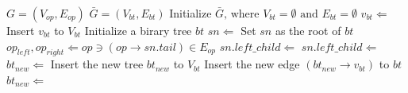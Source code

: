 \documentclass[12pt]{article}
\begin{document}
\begin{CJK}{UTF8}{bkai}
        \begin{algorithm}[h!]    \caption{}
        \begin{algorithmic}[1]
            \Require    $G = ( V_{op} , E_{op} )$ 
            \Ensure     $\bar{G} = ( V_{bt} , E_{bt} )$ 
            \State      Initialize $\bar{G} \textrm{, where } V_{bt} = \emptyset \textrm{ and } E_{bt} = \emptyset $
              \label{line:forroots}   
                \State      $v_{bt} \Leftarrow $
                \State      Insert $v_{bt}$ to $V_{bt}$
            \EndFor                                                                    \label{line:forroote}
            \Statex %
                     \label{line:bbts}
                \State      Initialize a birary tree $bt$
                \State      $sn \Leftarrow$ 
                \State      Set $sn$ as the root of $bt$
                \State      {}
                \State      {}
            \EndFunction                                \label{line:bbte}
            \Statex %
                      \label{line:gbts}
                     
                    \State      $op_{left}, op_{right} \Leftarrow op \ni (op \rightarrow sn.tail) \in E_{op}$ 
                      \label{line:deg}  \label{line:growifs}
                        \State      $sn.left\_child \Leftarrow$ 
                        \State      {}
                        \State      $sn.left\_child \Leftarrow$ 
                        \State      {}     \label{line:growife}
                    \Else       \label{line:growelses}
                        \State      $bt_{new} \Leftarrow$ 
                        \State      Insert the new tree $bt_{new}$ to $V_{bt}$
                        \State      Insert the new edge $(bt_{new} \rightarrow v_{bt})$ to $bt$
                        \State      $bt_{new} \Leftarrow$ 

\end{algorithmic}
\end{algorithm}
\end{CJK}
\end{document}
